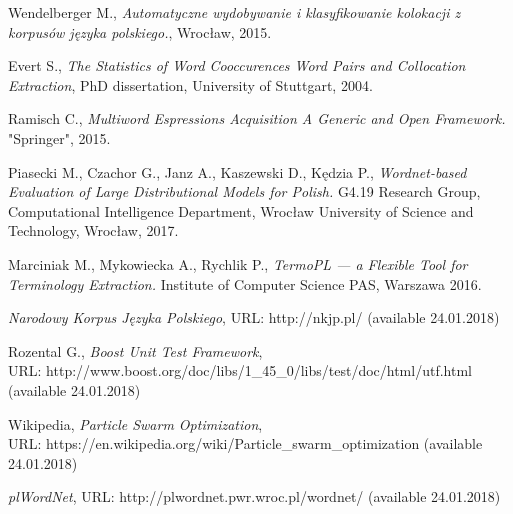 \begin{thebibliography}{9}

Wendelberger M., 
\textit{Automatyczne wydobywanie i klasyfikowanie kolokacji z korpusów języka polskiego.}, 
Wrocław, 2015.

Evert S.,
\textit{The Statistics of Word Cooccurences Word Pairs and Collocation Extraction}, 
PhD dissertation, University of Stuttgart, 2004.

Ramisch C., 
\textit{Multiword Espressions Acquisition A Generic and Open Framework.} 
"Springer", 2015.

Piasecki M., Czachor G., Janz A., Kaszewski D., Kędzia P.,
\textit{Wordnet-based Evaluation of Large Distributional Models for Polish.} 
G4.19 Research Group, Computational Intelligence Department, Wrocław University of Science and Technology, Wrocław, 2017.

Marciniak M., Mykowiecka A., Rychlik P.,
\textit{TermoPL — a Flexible Tool for Terminology Extraction.} 
Institute of Computer Science PAS, Warszawa 2016.

\textit{Narodowy Korpus Języka Polskiego}, 
URL: http://nkjp.pl/ (available 24.01.2018)

Rozental G., \textit{Boost Unit Test Framework}, \\
URL: http://www.boost.org/doc/libs/1\_45\_0/libs/test/doc/html/utf.html (available 24.01.2018)

Wikipedia, \textit{Particle Swarm Optimization}, \\
URL: https://en.wikipedia.org/wiki/Particle\_swarm\_optimization (available 24.01.2018)


\textit{plWordNet}, 
URL: http://plwordnet.pwr.wroc.pl/wordnet/ (available 24.01.2018)



\end{thebibliography}